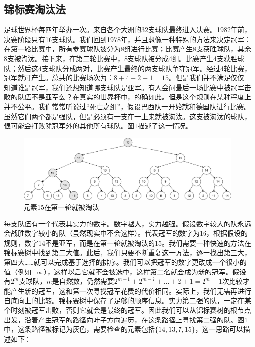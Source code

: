 \documentclass[b5paper]{ctexart}
\begin{document}
\subsection{锦标赛淘汰法}

足球世界杯每四年举办一次。来自各个大洲的32支球队最终进入决赛。1982年前，决赛阶段只有16支球队。我们回到1978年，并且想像一种特殊的方法来决定冠军：在第一轮比赛中，所有参赛球队被分为8组进行比赛；比赛产生8支获胜球队，其余8支被淘汰。接下来，在第二轮比赛中，8支球队被分成4组。比赛产生4支获胜球队；然后这4支球队分成两对，比赛产生最终的两支球队争夺冠军。经过4轮比赛，冠军就可产生。总共的比赛场次为：$8+4+2+1 = 15$。但是我们并不满足仅仅知道谁是冠军，我们还想知道哪支球队是亚军。有人会问最后一场比赛中被冠军击败的队伍不是亚军么？在真实的世界杯中，的确如此。但是这个规则在某种程度上并不公平。我们常常听说过“死亡之组”，假设巴西队一开始就和德国队进行比赛。虽然它们两个都是强队，但是必须有一支在一上来就被淘汰。这支被淘汰的球队，很可能会打败除冠军外的其他所有球队。图\ref{fig:tournament-tree-1}描述了这一情况。

\begin{figure}[htbp]
  \centering
  \includegraphics[scale=0.28]{img/tournament-tree-1}
  \caption{元素15在第一轮就被淘汰}
  \label{fig:tournament-tree-1}
\end{figure}

每支队伍有一个代表其实力的数字。数字越大，实力越强。假设数字较大的队永远会战胜数字较小的队（虽然现实中不会这样）。代表冠军的数字为16，根据假设的规则，数字14不是亚军，而是在第一轮就被淘汰的15。我们需要一种快速的方法在锦标赛树中找到第二大值。此后，我们只要不断重复这一方法，逐一找出第三大，第四大……就可以完成基于选择的排序。我们可以把冠军的数字更改成一个很小的值（例如$-\infty$），这样以后它就不会被选中，这样第二名就会成为新的冠军。假设有$2^m$支球队，$m$是自然数，仍然需要$2^{m-1} + 2^{m-2} + ... + 2 + 1 = 2^m-1$次比较才能产生新的冠军，这和第一次寻找冠军花费的代价相同。实际上，我们无需再进行自底向上的比较。锦标赛树中保存了足够的顺序信息。实力第二强的队，一定在某个时刻被冠军击败，否则它就会是最终的冠军。因此我们可以从锦标赛树的根节点出发，沿着产生冠军的路径向叶子方向遍历，在这条路径上寻找第二强的队。图\ref{fig:tournament-tree-1}中，这条路径被标记为灰色，需要检查的元素包括$\{14, 13, 7, 15\}$，这一思路可以描述如下：
\end{document}
